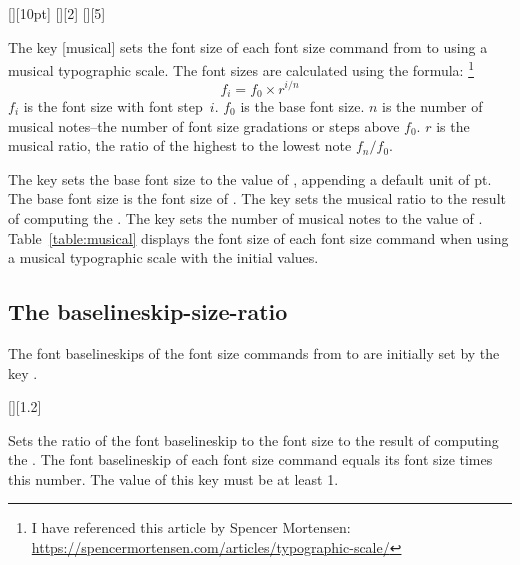 \documentclass{beery}
\begin{document}
[][10pt]%
\nopagebreak\newline
{}[][2]%
\nopagebreak\newline
{}[][5]

The key [musical] sets the font size of each font size command from  to  using a musical typographic scale.
The font sizes are calculated using the formula:%
\footnote
  {%
    I have referenced this article by Spencer Mortensen:
    \newline
    \url{https://spencermortensen.com/articles/typographic-scale/}%
  }
\begin{equation}\label{eq:musical}
  f_i = f_0 \times r ^ { i / n }
\end{equation}
$f_i$ is the font size with font step~$i$.
$f_0$ is the base font size.
$n$ is the number of musical notes\---the number of font size gradations or steps above $f_0$.
$r$ is the musical ratio, the ratio of the highest to the lowest note $ f_n / f_0 $.

The key  sets the base font size to the value of , appending a default unit of \unit{pt}.
The base font size is the font size of .
The key  sets the musical ratio to the result of computing the .
The key  sets the number of musical notes to the value of .
Table~\ref{table:musical} displays the font size of each font size command when using a musical typographic scale with the initial values.



\subsection{The baselineskip-size-ratio}
\label{subsec:baselineskipsizeratio}

The font baselineskips of the font size commands from  to  are initially set by the key .

[][1.2]
\KeepNextPar*

Sets the ratio of the font baselineskip to the font size to the result of computing the .
The font baselineskip of each font size command equals its font size times this number.
The value of this key must be at least \num{1}.
\end{document}
